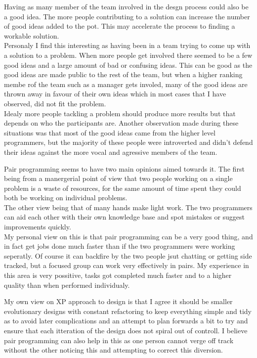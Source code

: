 \documentclass[11pt]{article}
\begin{document}
Having as many member of the team involved in the desgn process could also be a good idea.  The more people contributing to a solution can increase the number of good ideas added to the pot.  This may accelerate the process to finding a workable solution.
\\Personaly I find this interesting as having been in a team trying to come up with a solution to a problem.  When more people get involved there seemed to be a few good ideas and a large amount of bad or confusing ideas.  This can be good as the good ideas are made public to the rest of the team, but when a higher ranking membe rof the team such as a manager gets involed, many of the good ideas are thrown away in favour of their own ideas which in most cases that I have observed, did not fit the problem.
\\Idealy more people tackling a problem should produce more results but that depends on who the participants are.  Another observation made during these situations was that most of the good ideas came from the higher level programmers, but the majority of these people were introverted and didn't defend their ideas against the more vocal and agressive members of the team.

Pair programming seems to have two main opinions aimed towards it.  The first being from a manergerial point of view that two people working on a single problem is a waste of resources, for the same amount of time spent they could both be working on individual problems.
\\The other view being that of many hands make light work.  The two programmers can aid each other with their own knowledge base and spot mistakes or suggest improvements quickly.
\\My personal view on this is that pair programming can be a very good thing, and in fact get jobs done much faster than if the two programmers were working seperatly.  Of course it can backfire by the two people jsut chatting or getting side tracked, but a focused group can work very effectively in pairs.  My experience in this area is very possitive, tasks got completed much faster and to a higher quality than when performed individualy.

My own view on XP approach to design is that I agree it should be smaller evolutionary designs with constant refactoring to keep everything simple and tidy as to avoid later complications and an attempt to plan forwards a bit to try and ensure that each itteration of the design does not spiral out of controll.  I believe pair programming can also help in this as one person cannot verge off track without the other noticing this and attempting to correct this diversion.

\end{document}
